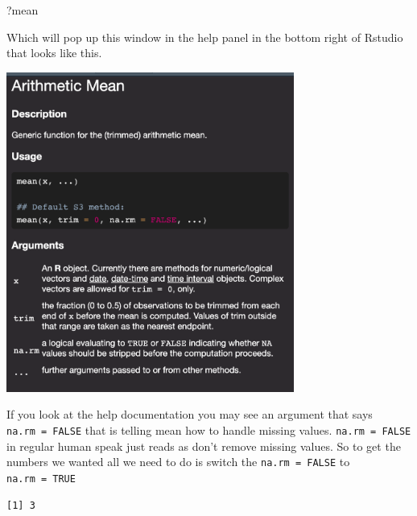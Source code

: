 \documentclass[
  letterpaper,
  DIV=11,
  numbers=noendperiod,
  oneside]{scrreprt}
\newenvironment{Shaded}{\begin{snugshade}}{\end{snugshade}}
\newcommand{\AttributeTok}[1]{\textcolor[rgb]{0.40,0.45,0.13}{#1}}
\newcommand{\ConstantTok}[1]{\textcolor[rgb]{0.56,0.35,0.01}{#1}}
\newcommand{\FunctionTok}[1]{\textcolor[rgb]{0.28,0.35,0.67}{#1}}
\newcommand{\NormalTok}[1]{\textcolor[rgb]{0.00,0.23,0.31}{#1}}
\newcommand{\SpecialCharTok}[1]{\textcolor[rgb]{0.37,0.37,0.37}{#1}}
\begin{document}
\begin{Shaded}
\begin{Highlighting}[]
\NormalTok{?mean}
\end{Highlighting}
\end{Shaded}

Which will pop up this window in the help panel in the bottom right of
Rstudio that looks like this.

\includegraphics[width=3.72in,height=\textheight]{figs/mean-help.png}

If you look at the help documentation you may see an argument that says
\texttt{na.rm\ =\ FALSE} that is telling mean how to handle missing
values. \texttt{na.rm\ =\ FALSE} in regular human speak just reads as
don't remove missing values. So to get the numbers we wanted all we need
to do is switch the \texttt{na.rm\ =\ FALSE} to \texttt{na.rm\ =\ TRUE}

\begin{Shaded}
\end{Shaded}

\begin{verbatim}
[1] 3
\end{verbatim}

\end{document}
